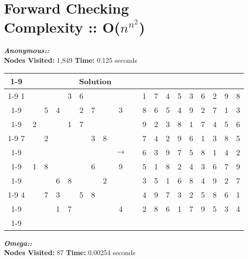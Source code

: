 \documentclass{article}
\begin{document}
\section*{Forward Checking\\
\small{Complexity :: O($n^{n^2}$)}}
\small\emph{\textbf{Anonymous::}}\\ \textbf{Nodes Visited:} 1,849 \textbf{Time:} 0.125 seconds\\
\begin{tabular}{||c|c|c||c|c|c||c|c|c|| c ||c|c|c||c|c|c||c|c|c||}
  \cmidrule{1-9} \cmidrule{11-19}
  \multicolumn{9}{|c|}{Problem} &                   & \multicolumn{9}{|c|}{Solution}   \\\cmidrule{1-9} \cmidrule{11-19} \morecmidrules \cmidrule{1-9} \cmidrule{11-19}
1 &   &   &   & 3 & 6 &   &   &   &  & 1 & 7 & 4 & 5 & 3 & 6 & 2 & 9 & 8\\\cmidrule{1-9} \cmidrule{11-19}
  &   & 5 & 4 &   & 2 & 7 &   & 3 &  & 8 & 6 & 5 & 4 & 9 & 2 & 7 & 1 & 3\\\cmidrule{1-9} \cmidrule{11-19}
  & 2 &   &   & 1 & 7 &   &   &   &  & 9 & 2 & 3 & 8 & 1 & 7 & 4 & 5 & 6\\\cmidrule{1-9} \cmidrule{11-19} \morecmidrules \cmidrule{1-9} \cmidrule{11-19}
7 &   & 2 &   &   &   & 3 & 8 &   &  & 7 & 4 & 2 & 9 & 6 & 1 & 3 & 8 & 5\\\cmidrule{1-9} \cmidrule{11-19}
  &   &   &   &   &   &   &   & $\rightarrow$  &  & 6 & 3 & 9 & 7 & 5 & 8 & 1 & 4 & 2\\\cmidrule{1-9} \cmidrule{11-19}
  & 1 & 8 &   &   &   & 6 &   & 9 &  & 5 & 1 & 8 & 2 & 4 & 3 & 6 & 7 & 9\\\cmidrule{1-9} \cmidrule{11-19} \morecmidrules \cmidrule{1-9} \cmidrule{11-19}
  &   &   & 6 & 8 &   &   & 2 &   &  & 3 & 5 & 1 & 6 & 8 & 4 & 9 & 2 & 7\\\cmidrule{1-9} \cmidrule{11-19}
4 &   & 7 & 3 &   & 5 & 8 &   &   &  & 4 & 9 & 7 & 3 & 2 & 5 & 8 & 6 & 1\\\cmidrule{1-9} \cmidrule{11-19}
  &   &   & 1 & 7 &   &   &   & 4 &  & 2 & 8 & 6 & 1 & 7 & 9 & 5 & 3 & 4\\\cmidrule{1-9} \cmidrule{11-19} \morecmidrules \cmidrule{1-9} \cmidrule{11-19}

 \end{tabular}
\newpage
\small\emph{\textbf{Omega::}}\\ \textbf{Nodes Visited:} 87 \textbf{Time:} 0.00254 seconds\\
\end{document}
